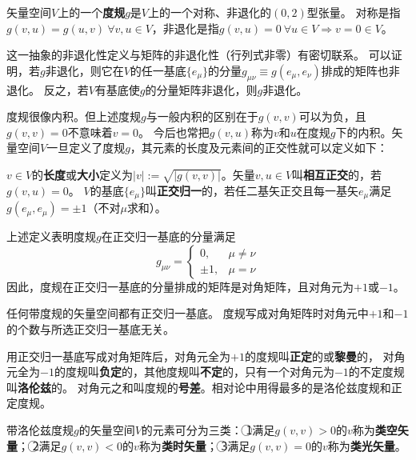 \begin{definition}
矢量空间$V$上的一个\textbf{度规}$g$是$V$上的一个对称、非退化的$(0, 2)$型张量。
对称是指$g(v, u) = g(u, v) ~ \forall v, u \in V$，非退化是指$g(v, u) = 0 ~ \forall u \in V \Rightarrow v = 0 \in V$。
\end{definition}

\begin{note}
这一抽象的非退化性定义与矩阵的非退化性（行列式非零）有密切联系。
可以证明，若$g$非退化，则它在$V$的任一基底$\{e_\mu\}$的分量$g_{\mu\nu} \equiv g(e_\mu, e_\nu)$排成的矩阵也非退化。
反之，若$V$有基底使$g$的分量矩阵非退化，则$g$非退化。
\end{note}

度规很像内积。但上述度规$g$与一般内积的区别在于$g(v, v)$可以为负，且$g(v, v) = 0$不意味着$v = 0$。
今后也常把$g(v, u)$称为$v$和$u$在度规$g$下的内积。矢量空间$V$一旦定义了度规$g$，其元素的长度及元素间的正交性就可以定义如下：

\begin{definition}
$v \in V$的\textbf{长度}或\textbf{大小}定义为$|v| := \sqrt{|g(v, v)|}$。矢量$v, u \in V$叫\textbf{相互正交}的，若$g(v, u) = 0$。
$V$的基底$\{e_\mu\}$叫\textbf{正交归一}的，若任二基矢正交且每一基矢$e_\mu$满足$g(e_\mu, e_\mu) = \pm 1$（不对$\mu$求和）。
\end{definition}

\begin{note}
上述定义表明度规$g$在正交归一基底的分量满足
$$
g_{\mu\nu} =
\begin{cases}
0, & \mu \neq \nu \\
\pm 1, & \mu = \nu
\end{cases}
$$
因此，度规在正交归一基底的分量排成的矩阵是对角矩阵，且对角元为$+1$或$-1$。
\end{note}

\begin{theorem}
任何带度规的矢量空间都有正交归一基底。
度规写成对角矩阵时对角元中$+1$和$-1$的个数与所选正交归一基底无关。
\end{theorem}

\begin{definition}
用正交归一基底写成对角矩阵后，对角元全为$+1$的度规叫\textbf{正定}的或\textbf{黎曼}的，
对角元全为$-1$的度规叫\textbf{负定}的，其他度规叫\textbf{不定}的，只有一个对角元为$-1$的不定度规叫\textbf{洛伦兹}的。
对角元之和叫度规的\textbf{号差}。相对论中用得最多的是洛伦兹度规和正定度规。
\end{definition}

\begin{definition}
带洛伦兹度规$g$的矢量空间$V$的元素可分为三类：
\textcircled{1}满足$g(v, v) > 0$的$v$称为\textbf{类空矢量}；
\textcircled{2}满足$g(v, v) < 0$的$v$称为\textbf{类时矢量}；
\textcircled{3}满足$g(v, v) = 0$的$v$称为\textbf{类光矢量}。
\end{definition}

